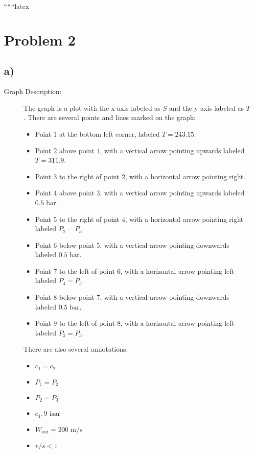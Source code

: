 
``````latex


\section*{Problem 2}

\subsection*{a)}

\begin{description}
    \item[Graph Description:] The graph is a plot with the x-axis labeled as $S$ and the y-axis labeled as $T$. There are several points and lines marked on the graph:
    \begin{itemize}
        \item Point $1$ at the bottom left corner, labeled $T=243.15$.
        \item Point $2$ above point $1$, with a vertical arrow pointing upwards labeled $T=311.9$.
        \item Point $3$ to the right of point $2$, with a horizontal arrow pointing right.
        \item Point $4$ above point $3$, with a vertical arrow pointing upwards labeled $0.5 \text{ bar}$.
        \item Point $5$ to the right of point $4$, with a horizontal arrow pointing right labeled $P_2 = P_3$.
        \item Point $6$ below point $5$, with a vertical arrow pointing downwards labeled $0.5 \text{ bar}$.
        \item Point $7$ to the left of point $6$, with a horizontal arrow pointing left labeled $P_4 = P_5$.
        \item Point $8$ below point $7$, with a vertical arrow pointing downwards labeled $0.5 \text{ bar}$.
        \item Point $9$ to the left of point $8$, with a horizontal arrow pointing left labeled $P_2 = P_3$.
    \end{itemize}
    There are also several annotations:
    \begin{itemize}
        \item $c_1 = c_2$
        \item $P_1 = P_2$
        \item $P_2 = P_3$
        \item $c_1, 9 \text{ isar}$
        \item $W_{\text{out}} = 200 \text{ m/s}$
        \item $v/s < 1$
    \end{itemize}
\end{description}

